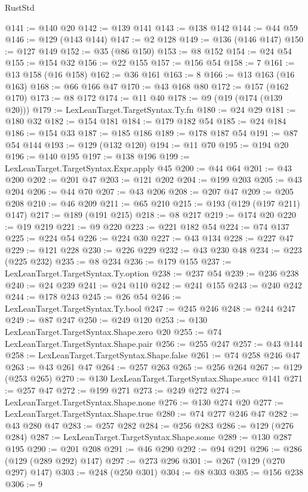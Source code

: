 \begin{lexlean}{RustStd}
\begin{coremodule}
{\begin{coremodule}
{{{{{{{{{{{{{{{{{{{{{{{{{{@141 := @140 @20
@142 := @139 @141
@143 := @138 @142
@144 := @44 @59
@146 := @129 (@143 @144)
@147 := @2 @128
@149 := @136 (@146 @147)
@150 := @127 @149
@152 := @35 (@86 @150)
@153 := @8 @152
@154 := @24 @54
@155 := @154 @32
@156 := @22 @155
@157 := @156 @54
@158 := 7
@161 := @13 @158 (@16 @158)
@162 := @36 @161
@163 := 8
@166 := @13 @163 (@16 @163)
@168 := @66 @166 @47
@170 := @43 @168 @80
@172 := @157 (@162 @170)
@173 := @8 @172
@174 := @11 @40
@178 := @9 (@19 (@174 (@139 @20)))
@179 := LexLeanTarget.TargetSyntax.Ty.fn
@180 := @24 @29
@181 := @180 @32
@182 := @154 @181
@184 := @179 @182 @54
@185 := @24 @184
@186 := @154 @33
@187 := @185 @186
@189 := @178 @187 @54
@191 := @87 @54 @144
@193 := @129 (@132 @120)
@194 := @11 @70
@195 := @194 @20
@196 := @140 @195
@197 := @138 @196
@199 := LexLeanTarget.TargetSyntax.Expr.apply @45
@200 := @44 @64
@201 := @43 @200
@202 := @201 @47
@203 := @121 @202
@204 := @199 @203
@205 := @43 @204
@206 := @44 @70
@207 := @43 @206
@208 := @207 @47
@209 := @205 @208
@210 := @46 @209
@211 := @65 @210
@215 := @193 (@129 (@197 @211) @147)
@217 := @189 (@191 @215)
@218 := @8 @217
@219 := @174 @20
@220 := @19 @219
@221 := @9 @220
@223 := @221 @182 @54
@224 := @74 @137
@225 := @224 @54
@226 := @224 @30
@227 := @43 @134
@228 := @227 @47
@229 := @121 @228
@230 := @226 @229
@232 := @43 @230 @48
@234 := @223 (@225 @232)
@235 := @8 @234
@236 := @179 @155
@237 := LexLeanTarget.TargetSyntax.Ty.option
@238 := @237 @54
@239 := @236 @238
@240 := @24 @239
@241 := @24 @110
@242 := @241 @155
@243 := @240 @242
@244 := @178 @243
@245 := @26 @54
@246 := LexLeanTarget.TargetSyntax.Ty.bool
@247 := @245 @246
@248 := @244 @247
@249 := @87 @247
@250 := @249 @120
@253 := @130 LexLeanTarget.TargetSyntax.Shape.zero @20
@255 := @74 LexLeanTarget.TargetSyntax.Shape.pair
@256 := @255 @247
@257 := @43 @144
@258 := LexLeanTarget.TargetSyntax.Shape.false
@261 := @74 @258 @246 @47
@263 := @43 @261 @47
@264 := @257 @263
@265 := @256 @264
@267 := @129 (@253 @265)
@270 := @130 LexLeanTarget.TargetSyntax.Shape.succ @141
@271 := @257 @47
@272 := @199 @271
@273 := @249 @272
@274 := LexLeanTarget.TargetSyntax.Shape.none
@276 := @130 @274 @20
@277 := LexLeanTarget.TargetSyntax.Shape.true
@280 := @74 @277 @246 @47
@282 := @43 @280 @47
@283 := @257 @282
@284 := @256 @283
@286 := @129 (@276 @284)
@287 := LexLeanTarget.TargetSyntax.Shape.some
@289 := @130 @287 @195
@290 := @201 @208
@291 := @46 @290
@292 := @94 @291
@296 := @286 (@129 (@289 @292) @147)
@297 := @273 @296
@301 := @267 (@129 (@270 @297) @147)
@303 := @248 (@250 @301)
@304 := @8 @303
@305 := @156 @238
@306 := 9
}}}}}}}}}}}}}}}}}}}}}}}}}}
\end{coremodule}}
\end{coremodule}
\end{lexlean}
